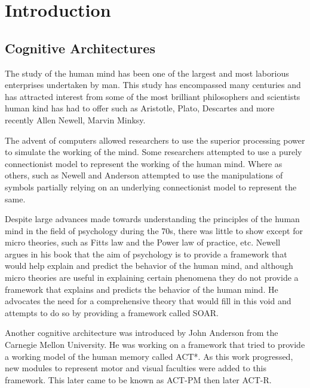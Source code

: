 \chapter{Introduction}
\label{chap-one}


\section {Cognitive Architectures}
\label{introCogArch}
The study of the human mind has been one of the largest and most
laborious enterprises undertaken by man. This study has encompassed many
centuries and has attracted interest from some of the most brilliant
philosophers and scientists human kind has had to offer such as
Aristotle, Plato, Descartes and more recently Allen Newell, Marvin
Minksy. 

The advent of computers allowed researchers to use the superior
processing power to simulate the working of the
mind. Some researchers attempted to use a purely connectionist model to
represent the working of the human mind. Where as
others, such as Newell and Anderson attempted to use the manipulations
of symbols partially relying on an underlying connectionist model to
represent the same.  

Despite large advances made towards understanding the principles of
the human mind in the field of psychology during the 70s, there was little to show
except for micro theories, such as Fitts law and the Power law of
practice, etc. Newell argues in his book \cite{Newell:1990aa} that the aim of psychology is to provide a framework
that would help explain and predict the behavior of the human mind, and although micro
theories are useful in explaining certain phenomena they do not provide a
framework that explains and predicts the behavior of the human
mind. He advocates the need for a comprehensive theory that would fill
in this void and attempts to do so by providing a framework called SOAR. 

Another cognitive architecture was introduced by John Anderson from
the Carnegie Mellon University. He was working on a framework that
tried to provide a working model of the 
human memory called ACT*. As this work progressed, new modules to
represent motor and visual faculties were added to this
framework. This later came to be known as ACT-PM then later ACT-R. 

